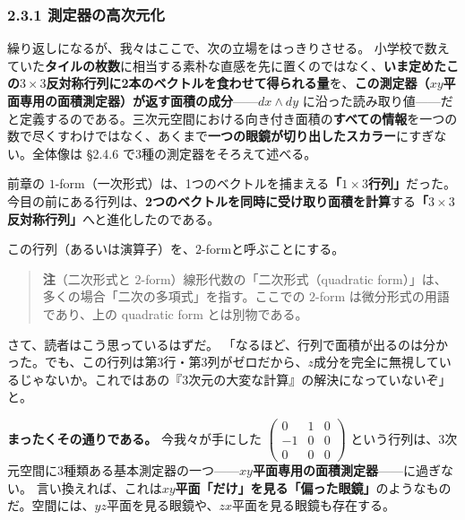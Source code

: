 \documentclass[a4paper,12pt,openany]{book}
\begin{document}
\hypertarget{ux6e2cux5b9aux5668ux306eux9ad8ux6b21ux5143ux5316}{%
\subsubsection{2.3.1
測定器の高次元化}\label{ux6e2cux5b9aux5668ux306eux9ad8ux6b21ux5143ux5316}}

繰り返しになるが、我々はここで、次の立場をはっきりさせる。
小学校で数えていた\textbf{タイルの枚数}に相当する素朴な直感を先に置くのではなく、\textbf{いま定めたこの}\(3 \times 3\)\textbf{反対称行列に2本のベクトルを食わせて得られる量}を、\textbf{この測定器（}\(xy\)\textbf{平面専用の面積測定器）が返す面積の成分}——\(dx \wedge dy\)
に沿った読み取り値——だと定義するのである。三次元空間における向き付き面積の\textbf{すべての情報}を一つの数で尽くすわけではなく、あくまで\textbf{一つの眼鏡が切り出したスカラー}にすぎない。全体像は
§2.4.6 で3種の測定器をそろえて述べる。

前章の
\(1\)-form（一次形式）は、1つのベクトルを捕まえる\textbf{「}\(1 \times 3\)\textbf{行列」}だった。
今目の前にある行列は、\textbf{2つのベクトルを同時に受け取り面積を計算}する\textbf{「}\(3 \times 3\)\textbf{反対称行列」}へと進化したのである。

この行列（あるいは演算子）を、\(2\)-formと呼ぶことにする。

\begin{quote}
\textbf{注}（二次形式と \(2\)-form）線形代数の「二次形式（quadratic
form）」は、多くの場合「二次の多項式」を指す。ここでの \(2\)-form
は微分形式の用語であり、上の quadratic form とは別物である。
\end{quote}

さて、読者はこう思っているはずだ。
「なるほど、行列で面積が出るのは分かった。でも、この行列は第3行・第3列がゼロだから、\(z\)成分を完全に無視しているじゃないか。これではあの『3次元の大変な計算』の解決になっていないぞ」と。

\textbf{まったくその通りである。} 今我々が手にした
\(\begin{pmatrix} 0 & 1 & 0 \\ -1 & 0 & 0 \\ 0 & 0 & 0 \end{pmatrix}\)
という行列は、3次元空間に3種類ある基本測定器の一つ——\(xy\)\textbf{平面専用の面積測定器}——に過ぎない。
言い換えれば、これは\(xy\)\textbf{平面「だけ」を見る「偏った眼鏡」}のようなものだ。空間には、\(yz\)平面を見る眼鏡や、\(zx\)平面を見る眼鏡も存在する。

\par\vspace{0.35em}\par
\end{document}
